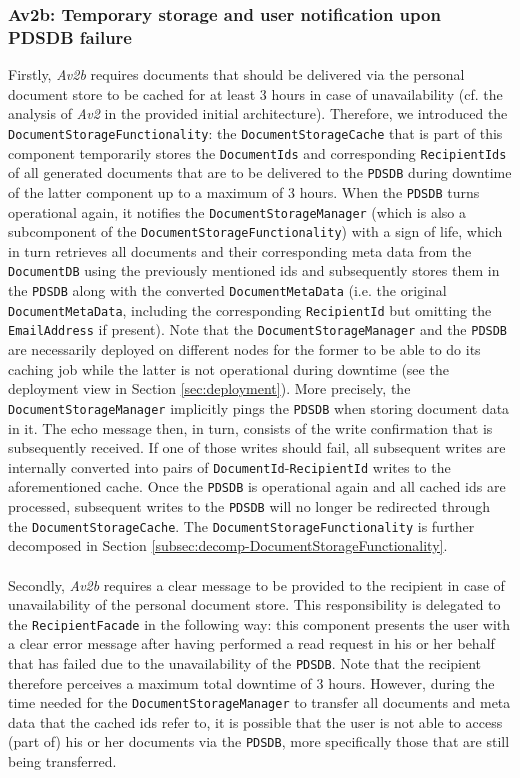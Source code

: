 \documentclass[a4paper,10pt]{article}
\begin{document}
\subsubsection{Av2b: Temporary storage and user notification upon PDSDB failure}\label{subsubsec:Av2b}
Firstly, \textit{Av2b} requires documents that should be delivered via the personal document store to be cached for at least 3 hours in case of unavailability (cf. the analysis of \textit{Av2} in the provided initial architecture). Therefore, we introduced the \texttt{DocumentStorageFunctionality}: the \texttt{DocumentStorageCache} that is part of this component temporarily stores the \texttt{DocumentIds} and corresponding \texttt{RecipientIds} of all generated documents that are to be delivered to the \texttt{PDSDB} during downtime of the latter component up to a maximum of 3 hours. When the \texttt{PDSDB} turns operational again, it notifies the \texttt{DocumentStorageManager} (which is also a subcomponent of the \texttt{DocumentStorageFunctionality}) with a sign of life, which in turn retrieves all documents and their corresponding meta data from the \texttt{DocumentDB} using the previously mentioned ids and subsequently stores them in the \texttt{PDSDB} along with the converted \texttt{DocumentMetaData} (i.e. the original \texttt{DocumentMetaData}, including the corresponding \texttt{RecipientId} but omitting the \texttt{EmailAddress} if present). Note that the \texttt{DocumentStorageManager} and the \texttt{PDSDB} are necessarily deployed on different nodes for the former to be able to do its caching job while the latter is not operational during downtime (see the deployment view in Section \ref{sec:deployment}). More precisely, the \texttt{DocumentStorageManager} implicitly pings the \texttt{PDSDB} when storing document data in it. The echo message then, in turn, consists of the write confirmation that is subsequently received. If one of those writes should fail, all subsequent writes are internally converted into pairs of \texttt{DocumentId}-\texttt{RecipientId} writes to the aforementioned cache. Once the \texttt{PDSDB} is operational again and all cached ids are processed, subsequent writes to the \texttt{PDSDB} will no longer be redirected through the \texttt{DocumentStorageCache}. The \texttt{DocumentStorageFunctionality} is further decomposed in Section \ref{subsec:decomp-DocumentStorageFunctionality}.\\\\
Secondly, \textit{Av2b} requires a clear message to be provided to the recipient in case of unavailability of the personal document store. This responsibility is delegated to the \texttt{RecipientFacade} in the following way: this component presents the user with a clear error message after having performed a read request in his or her behalf that has failed due to the unavailability of the \texttt{PDSDB}. Note that the recipient therefore perceives a maximum total downtime of 3 hours. However, during the time needed for the \texttt{DocumentStorageManager} to transfer all documents and meta data that the cached ids refer to, it is possible that the user is not able to access (part of) his or her documents via the \texttt{PDSDB}, more specifically those that are still being transferred.
\end{document}
